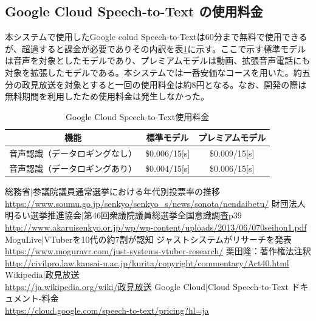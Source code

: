 \documentclass[a4paper,12pt]{jsarticle}
\begin{document}
\subsection{Google Cloud Speech-to-Text の使用料金}

本システムで使用したGoogle colud Speech-to-Textは60分まで無料で使用できるが、超過すると課金が必要でありその内訳を表\ref{tab:GCS2T}に示す\cite{GCS2T}。ここで示す標準モデルは音声を対象としたモデルであり、プレミアムモデルは動画、拡張音声電話にも対象を拡張したモデルである。本システムでは一番安価なコースを用いた。約五分の政見放送を対象とすると一回の使用料金は約8円となる。なお、開発の際は無料期間を利用したため使用料金は発生しなかった。

\begin{table}[H]
	\begin{center}
		\begin{tabular}{c|c|c}
			機能&標準モデル&プレミアムモデル\\ \hline
			音声認識（データロギングなし）&\$0.006/15[s]&\$0.009/15[s]\\
			音声認識（データロギングあり）&\$0.004/15[s]&\$0.006/15[s]
		\end{tabular}
		\caption{Google Cloud Speech-to-Text使用料金}
		\label{tab:GCS2T}
	\end{center}
\end{table}


\begin{thebibliography}{99}
	 総務省|参議院議員通常選挙における年代別投票率の推移 \\\url{https://www.soumu.go.jp/senkyo/senkyo_s/news/sonota/nendaibetu/}
	 財団法人明るい選挙推進協会|第46回衆議院議員総選挙全国意識調査p39\\\url{http://www.akaruisenkyo.or.jp/wp/wp-content/uploads/2013/06/070seihon1.pdf}
	 MoguLive|VTuberを10代の約7割が認知 ジャストシステムがリサーチを発表	\\\url{https://www.moguravr.com/just-systems-vtuber-research/}
	 栗田隆：著作権法注釈\\\url{http://civilpro.law.kansai-u.ac.jp/kurita/copyright/commentary/Act40.html}
	 Wikipedia|政見放送 \\\url{https://ja.wikipedia.org/wiki/政見放送}
	 Google Cloud|Cloud Speech-to-Text ドキュメント-料金 \\\url{https://cloud.google.com/speech-to-text/pricing?hl=ja}

\end{thebibliography}
\end{document}
